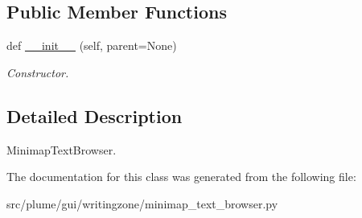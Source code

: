 \subsection*{Public Member Functions}
\begin{DoxyCompactItemize}
\item 
def \hyperlink{classplume-creator_1_1src_1_1plume_1_1gui_1_1writingzone_1_1minimap__text__browser_1_1_text_browser_ab9f212edafa1a6ae8b4b57a4645fdb60}{\+\_\+\+\_\+init\+\_\+\+\_\+} (self, parent=None)\hypertarget{classplume-creator_1_1src_1_1plume_1_1gui_1_1writingzone_1_1minimap__text__browser_1_1_text_browser_ab9f212edafa1a6ae8b4b57a4645fdb60}{}\label{classplume-creator_1_1src_1_1plume_1_1gui_1_1writingzone_1_1minimap__text__browser_1_1_text_browser_ab9f212edafa1a6ae8b4b57a4645fdb60}

\begin{DoxyCompactList}\small\item\em Constructor. \end{DoxyCompactList}\end{DoxyCompactItemize}


\subsection{Detailed Description}
Minimap\+Text\+Browser. 

The documentation for this class was generated from the following file\+:\begin{DoxyCompactItemize}
\item 
src/plume/gui/writingzone/minimap\+\_\+text\+\_\+browser.\+py\end{DoxyCompactItemize}
